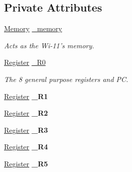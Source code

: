 \subsection*{Private Attributes}
\begin{DoxyCompactItemize}
\item 
\hypertarget{classWi11_a07d3ee0573a4ea7d260574120da9dec1}{
\hyperlink{classMemory}{Memory} \hyperlink{classWi11_a07d3ee0573a4ea7d260574120da9dec1}{\_\-memory}}
\label{classWi11_a07d3ee0573a4ea7d260574120da9dec1}

\begin{DoxyCompactList}\small\item\em Acts as the Wi-\/11's memory. \item\end{DoxyCompactList}\item 
\hypertarget{classWi11_afdde77e5fbf30ef6647572f5c3050b7c}{
\hyperlink{classRegister}{Register} \hyperlink{classWi11_afdde77e5fbf30ef6647572f5c3050b7c}{\_\-R0}}
\label{classWi11_afdde77e5fbf30ef6647572f5c3050b7c}

\begin{DoxyCompactList}\small\item\em The 8 general purpose registers and PC. \item\end{DoxyCompactList}\item 
\hypertarget{classWi11_aa3d29c00067f173976406a1b294abe21}{
\hyperlink{classRegister}{Register} {\bfseries \_\-R1}}
\label{classWi11_aa3d29c00067f173976406a1b294abe21}

\item 
\hypertarget{classWi11_af7831a8e06325bf439bfa5121663fe84}{
\hyperlink{classRegister}{Register} {\bfseries \_\-R2}}
\label{classWi11_af7831a8e06325bf439bfa5121663fe84}

\item 
\hypertarget{classWi11_a1d05b03b7df1196df0abddd7d2a37e09}{
\hyperlink{classRegister}{Register} {\bfseries \_\-R3}}
\label{classWi11_a1d05b03b7df1196df0abddd7d2a37e09}

\item 
\hypertarget{classWi11_a3ce79df6a51764e7705aa259177bd420}{
\hyperlink{classRegister}{Register} {\bfseries \_\-R4}}
\label{classWi11_a3ce79df6a51764e7705aa259177bd420}

\item 
\hypertarget{classWi11_a3deb52eb81c25cb36572b4285eedebcb}{
\hyperlink{classRegister}{Register} {\bfseries \_\-R5}}
\label{classWi11_a3deb52eb81c25cb36572b4285eedebcb}


\end{DoxyCompactItemize}
